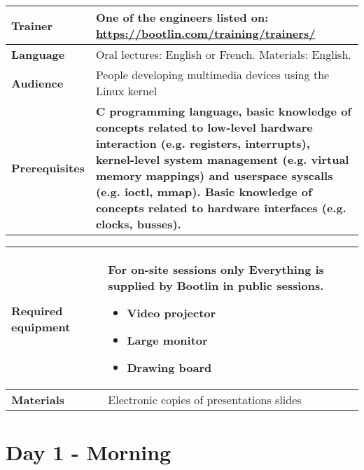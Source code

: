 \documentclass[a4paper,12pt,obeyspaces,spaces,hyphens]{article}
\begin{document}
{\begin{tabularx}{\textwidth}{|g|h|}
    {\bf Trainer} & One of the engineers listed on:
    \newline \url{https://bootlin.com/training/trainers/}\\
    \hline

    {\bf Language} & Oral lectures: English or French.
    \newline Materials: English.\\
    \hline

    {\bf Audience} & People developing multimedia devices using the Linux kernel\\
    \hline

    {\bf Prerequisites} &
    {\bf C programming language, basic knowledge of concepts related to low-level
    hardware interaction (e.g. registers, interrupts),
    kernel-level system management (e.g. virtual memory mappings) and
    userspace syscalls (e.g. ioctl, mmap).
    Basic knowledge of concepts related to hardware interfaces
    (e.g. clocks, busses).}\\
    \hline

  \end{tabularx}

  \begin{tabularx}{\textwidth}{|g|h|}
    {\bf Required equipment} &
    {\bf For on-site sessions only}
    \newline Everything is supplied by Bootlin in public sessions.
    \begin{itemize}
    \item Video projector
    \item Large monitor
    \item Drawing board
    \end{itemize}\\
    \hline

    {\bf Materials} & Electronic copies of presentations slides\\
    \hline

\end{tabularx}}
\normalsize

\section{Day 1 - Morning}
\end{document}
